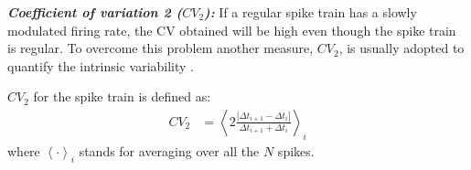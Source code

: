 \textbf{\textit{Coefficient of variation 2 ($CV_2$):}}
If a regular spike train has a slowly modulated firing rate, the CV obtained will be high even though the spike train is regular. To overcome this problem another measure, $CV_2$,  is usually adopted to quantify the intrinsic variability \cite{Holt1996}.

$CV_2$ for the spike train is defined as: \\
\begin{align}
CV_{2} &= \left\langle 2 \frac{|\Delta t_{i+1} - \Delta t_{i}|}{\Delta t_{i+1} + \Delta t_{i}} \right\rangle_{i}
\end{align}
where $\left\langle \cdot \right\rangle_{i}$ stands for averaging over all the $N$ spikes.


